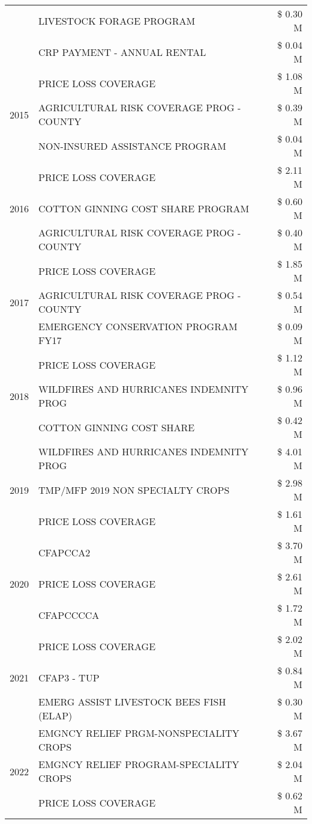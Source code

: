 \begin{tabular}{llr}
 & LIVESTOCK FORAGE PROGRAM & \$ 0.30 M \\
 & CRP PAYMENT - ANNUAL RENTAL & \$ 0.04 M \\
\cline{1-3}
\multirow[t]{3}{*}{2015} & PRICE LOSS COVERAGE & \$ 1.08 M \\
 & AGRICULTURAL RISK COVERAGE PROG - COUNTY & \$ 0.39 M \\
 & NON-INSURED ASSISTANCE PROGRAM & \$ 0.04 M \\
\cline{1-3}
\multirow[t]{3}{*}{2016} & PRICE LOSS COVERAGE & \$ 2.11 M \\
 & COTTON GINNING COST SHARE PROGRAM & \$ 0.60 M \\
 & AGRICULTURAL RISK COVERAGE PROG - COUNTY & \$ 0.40 M \\
\cline{1-3}
\multirow[t]{3}{*}{2017} & PRICE LOSS COVERAGE & \$ 1.85 M \\
 & AGRICULTURAL RISK COVERAGE PROG - COUNTY & \$ 0.54 M \\
 & EMERGENCY CONSERVATION PROGRAM FY17 & \$ 0.09 M \\
\cline{1-3}
\multirow[t]{3}{*}{2018} & PRICE LOSS COVERAGE & \$ 1.12 M \\
 & WILDFIRES AND HURRICANES INDEMNITY PROG & \$ 0.96 M \\
 & COTTON GINNING COST SHARE & \$ 0.42 M \\
\cline{1-3}
\multirow[t]{3}{*}{2019} & WILDFIRES AND HURRICANES INDEMNITY PROG & \$ 4.01 M \\
 & TMP/MFP 2019 NON SPECIALTY CROPS & \$ 2.98 M \\
 & PRICE LOSS COVERAGE & \$ 1.61 M \\
\cline{1-3}
\multirow[t]{3}{*}{2020} & CFAPCCA2 & \$ 3.70 M \\
 & PRICE LOSS COVERAGE & \$ 2.61 M \\
 & CFAPCCCCA & \$ 1.72 M \\
\cline{1-3}
\multirow[t]{3}{*}{2021} & PRICE LOSS COVERAGE & \$ 2.02 M \\
 & CFAP3 - TUP & \$ 0.84 M \\
 & EMERG ASSIST LIVESTOCK BEES FISH (ELAP) & \$ 0.30 M \\
\cline{1-3}
\multirow[t]{3}{*}{2022} & EMGNCY RELIEF PRGM-NONSPECIALITY CROPS & \$ 3.67 M \\
 & EMGNCY RELIEF PROGRAM-SPECIALITY CROPS & \$ 2.04 M \\
 & PRICE LOSS COVERAGE & \$ 0.62 M \\
\cline{1-3}
\bottomrule
\end{tabular}
